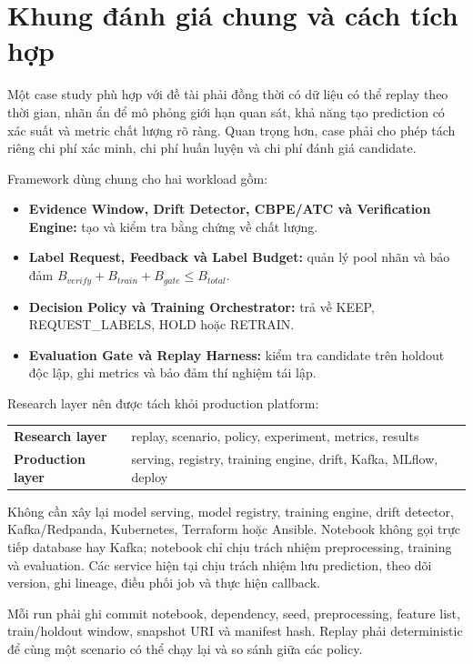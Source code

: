 \section{Khung đánh giá chung và cách tích hợp}

Một case study phù hợp với đề tài phải đồng thời có dữ liệu có thể replay theo thời gian, nhãn ẩn để mô phỏng giới hạn quan sát, khả năng tạo prediction có xác suất và metric chất lượng rõ ràng. Quan trọng hơn, case phải cho phép tách riêng chi phí xác minh, chi phí huấn luyện và chi phí đánh giá candidate.

Framework dùng chung cho hai workload gồm:

\begin{itemize}
  \item \textbf{Evidence Window, Drift Detector, CBPE/ATC và Verification Engine:} tạo và kiểm tra bằng chứng về chất lượng.
  \item \textbf{Label Request, Feedback và Label Budget:} quản lý pool nhãn và bảo đảm
  \(\mathit{B}_{verify}+\mathit{B}_{train}+\mathit{B}_{gate}\leq\mathit{B}_{total}\).
  \item \textbf{Decision Policy và Training Orchestrator:} trả về KEEP, REQUEST\_LABELS, HOLD hoặc RETRAIN.
  \item \textbf{Evaluation Gate và Replay Harness:} kiểm tra candidate trên holdout độc lập, ghi metrics và bảo đảm thí nghiệm tái lập.
\end{itemize}

Research layer nên được tách khỏi production platform:

\begin{center}
\begin{tabular}{@{}ll@{}}
\toprule
\textbf{Research layer} & replay, scenario, policy, experiment, metrics, results\\
\textbf{Production layer} & serving, registry, training engine, drift, Kafka, MLflow, deploy\\
\bottomrule
\end{tabular}
\end{center}

Không cần xây lại model serving, model registry, training engine, drift detector, Kafka/Redpanda, Kubernetes, Terraform hoặc Ansible. Notebook không gọi trực tiếp database hay Kafka; notebook chỉ chịu trách nhiệm preprocessing, training và evaluation. Các service hiện tại chịu trách nhiệm lưu prediction, theo dõi version, ghi lineage, điều phối job và thực hiện callback.

Mỗi run phải ghi commit notebook, dependency, seed, preprocessing, feature list, train/holdout window, snapshot URI và manifest hash. Replay phải deterministic để cùng một scenario có thể chạy lại và so sánh giữa các policy.

